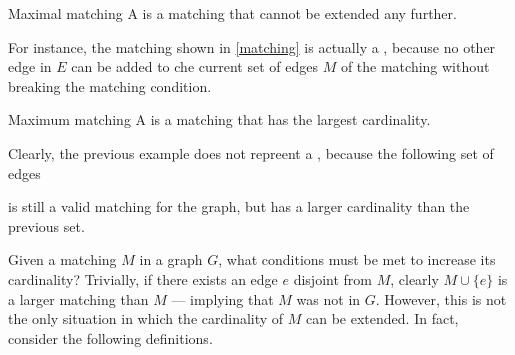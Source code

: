\documentclass[a4paper, 12pt]{report}
\begin{document}
    \begin{frameddefn}{Maximal matching}
        A  is a matching that cannot be extended any further.
    \end{frameddefn}
    
    For instance, the matching shown in \cref{matching} is actually a , because no other edge in $E$ can be added to che current set of edges $M$ of the matching without breaking the matching condition.

    \begin{frameddefn}{Maximum matching}
        A  is a matching that has the largest cardinality.
    \end{frameddefn}

    Clearly, the previous example does not repreent a , because the following set of edges

     \begin{figure}[H]
        \centering
    \end{figure}

    is still a valid matching for the graph, but has a larger cardinality than the previous set.

    Given a matching $M$ in a graph $G$, what conditions must be met to increase its cardinality? Trivially, if there exists an edge $e$ disjoint from $M$, clearly $M \cup \{e\}$ is a larger matching than $M$ --- implying that $M$ was not  in $G$. However, this is not the only situation in which the cardinality of $M$ can be extended. In fact, consider the following definitions.
\end{document}

